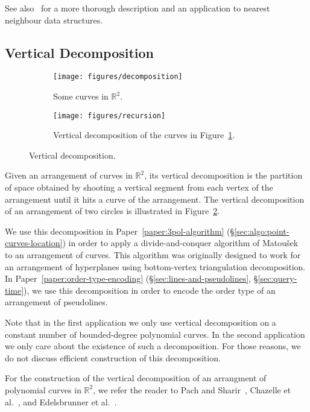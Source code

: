 See also~\cite{Cla88} for a more thorough description and an application to
nearest neighbour data structures.

\subsection{Vertical Decomposition}%
\label{sec:arrangements:vertical-decomposition}

\begin{figure}
	\centering{}
    \begin{subfigure}[t]{0.5\textwidth}
		\centering
		\texttt{[image: figures/decomposition]}
		\caption{Some curves in $\mathbb{R}^2$.}%
		\label{fig:some-curves-in-R2}
    \end{subfigure}%
    \begin{subfigure}[t]{0.5\textwidth}
		\centering
		\texttt{[image: figures/recursion]}
		\caption{Vertical decomposition of the curves in Figure~\ref{fig:some-curves-in-R2}.}%
    \end{subfigure}
	\caption{Vertical decomposition.}\label{fig:vd}
\end{figure}

Given an arrangement of curves in \(\mathbb{R}^2\), its vertical decomposition
is the partition of space obtained by shooting a vertical segment from each
vertex of the arrangement until it hits a curve of the arrangement. The
vertical decomposition of an arrangement of two circles is illustrated
in Figure~\ref{fig:vd}.

We use this decomposition in Paper~\ref{paper:3pol-algorithm}
(\S\ref{sec:algo:point-curves-location}) in order to apply a divide-and-conquer
algorithm of Matou{\v s}ek~\cite{Ma93} to an arrangement of curves.
This algorithm was originally designed to work for an arrangement of
hyperplanes using bottom-vertex triangulation decomposition.
%
In Paper~\ref{paper:order-type-encoding} (\S\ref{sec:lines-and-pseudolines},
\S\ref{sec:query-time}), we use this decomposition in order to
encode the order type of an arrangement of pseudolines.

Note that in the first application we only use vertical decomposition on a
constant number of bounded-degree polynomial curves.
%
In the second application we only care about the existence of such a
decomposition.
%
For those reasons, we do not discuss efficient construction of this
decomposition.

For the construction of the vertical decomposition of an arrangment of
polynomial curves in \(\mathbb{R}^2\),
we refer the reader to Pach and Sharir~\cite{Alcala}, Chazelle et
al.~\cite{CEGS91}, and Edelsbrunner et al.~\cite{EGPPSS92}.

